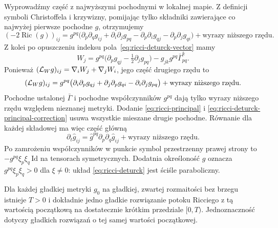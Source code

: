 Wyprowadźmy część z najwyższymi pochodnymi
w lokalnej mapie. Z definicji symboli Christoffela
i krzywizny, pomijając tylko składniki zawierające
co najwyżej pierwsze pochodne $g$, otrzymujemy
\begin{equation}\label{eq:ricci-principal}
 (-2\operatorname{Ric}(g))_{ij}
 =g^{pq}\bigl(
   \partial_p\partial_q g_{ij}
  +\partial_i\partial_j g_{pq}
  -\partial_p\partial_i g_{qj}
  -\partial_p\partial_j g_{qi}\bigr)
  +\text{wyrazy niższego rzędu}.
\end{equation}
Z kolei po opuszczeniu indeksu pola~\eqref{eq:ricci-deturck-vector}
mamy
\[
 W_j=g^{pq}\bigl(\partial_p g_{qj}
                  -\tfrac12\partial_j g_{pq}\bigr)
      -g_{jk}g^{pq}\bar\Gamma^k_{pq}.
\]
Ponieważ $(\mathcal L_Wg)_{ij}=\nabla_iW_j+\nabla_jW_i$,
jego część drugiego rzędu to
\begin{equation}\label{eq:ricci-deturck-principal-correction}
 (\mathcal L_Wg)_{ij}
 =g^{pq}\bigl(
   \partial_i\partial_p g_{qj}
  +\partial_j\partial_p g_{qi}
  -\partial_i\partial_j g_{pq}\bigr)
  +\text{wyrazy niższego rzędu}.
\end{equation}
Pochodne ustalonej $\bar\Gamma$ i pochodne współczynników
$g^{pq}$ dają tylko wyrazy niższego rzędu względem
nieznanej metryki. Dodanie
\eqref{eq:ricci-principal} i
\eqref{eq:ricci-deturck-principal-correction} usuwa
wszystkie mieszane drugie pochodne. Równanie dla
każdej składowej ma więc część główną
\begin{equation}\label{eq:ricci-deturck-heat-principal}
 \partial_t\widehat g_{ij}
     =\widehat g^{pq}\partial_p\partial_q
             \widehat g_{ij}
       +\text{wyrazy niższego rzędu}.
\end{equation}
Po zamrożeniu współczynników w punkcie symbol
przestrzenny prawej strony to
$-g^{pq}\xi_p\xi_q\,\mathrm{Id}$ na tensorach
symetrycznych. Dodatnia określoność $g$ oznacza
$g^{pq}\xi_p\xi_q>0$ dla $\xi\ne0$: układ
\eqref{eq:ricci-deturck} jest ściśle paraboliczny.

\begin{twierdzenie}
\label{thm:ricci-short-time}
Dla każdej gładkiej metryki $g_0$ na gładkiej,
zwartej rozmaitości bez brzegu istnieje $T>0$
i dokładnie jedno gładkie rozwiązanie potoku Ricciego
z tą wartością początkową na dostatecznie krótkim
przedziale $[0,T)$. Jednoznaczność dotyczy gładkich
rozwiązań o tej samej wartości początkowej.
\end{twierdzenie}


